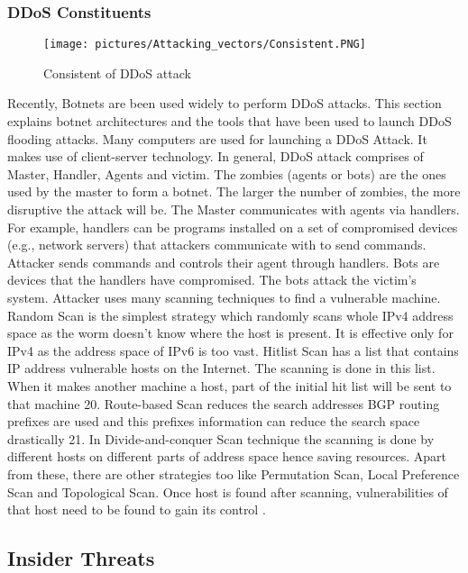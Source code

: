 \documentclass[twocolumn]{article}
\begin{document}
\subsubsection{DDoS Constituents}
\begin{figure}[H]
\centering
\texttt{[image: pictures/Attacking\_vectors/Consistent.PNG]}
\caption{Consistent of DDoS attack}
\label{fig:consistnt}
\end{figure}
Recently, Botnets are been used widely to perform DDoS attacks. This section explains botnet architectures and
the tools that have been used to launch DDoS flooding attacks. Many computers are used for launching a DDoS
Attack. It makes use of client-server technology. In general, DDoS attack comprises of Master, Handler, Agents and
victim. The zombies (agents or bots) are the ones used by the master to form a botnet. The larger the number of zombies, the more disruptive the attack will be. The Master communicates with agents via handlers. For example, handlers can be programs installed on a set of compromised devices (e.g., network servers) that attackers communicate with to send commands. Attacker sends commands and controls their agent through handlers. Bots are
devices that the handlers have compromised.
The bots attack the victim’s system. Attacker uses many scanning techniques to find a vulnerable machine.
Random Scan is the simplest strategy which randomly scans whole IPv4 address space as the worm doesn’t know
where the host is present. It is effective only for IPv4 as the address space of IPv6 is too vast. Hitlist Scan has a
list that contains IP address vulnerable hosts on the Internet. The scanning is done in this list. When it makes
another machine a host, part of the initial hit list will be sent to that machine 20. Route-based Scan reduces the search
addresses BGP routing prefixes are used and this prefixes information can reduce the search space drastically 21. In
Divide-and-conquer Scan technique the scanning is done by different hosts on different parts of address space hence
saving resources. Apart from these, there are other strategies too like Permutation Scan, Local Preference Scan
and Topological Scan. Once host is found after scanning, vulnerabilities of that host need to be found to gain its
control \cite{deshmukh2015understanding}.
\subsection{Insider Threats}
\end{document}
